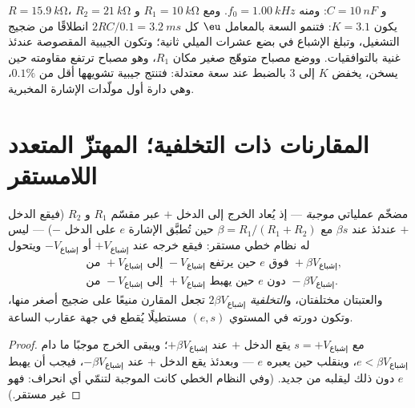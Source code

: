 \begin{example}\label{ex:b2:feedback-oscillators:wiennumbers}
$R = \qty{15.9}{k\ohm}$، و $C = \qty{10}{nF}$: ومنه $f_0 = \qty{1.00}{kHz}$. ومع $R_1 =
\qty{10}{k\ohm}$ و $R_2 = \qty{21}{k\ohm}$ يكون $K = 3.1$: فتنمو السعة بالمعامل
$\eu$ كل $2RC/0.1 = \qty{3.2}{ms}$ انطلاقًا من ضجيج التشغيل، وتبلغ
الإشباع في بضع عشرات الميلي ثانية؛ وتكون الجيبية المقصوصة عندئذ
غنية بالتوافقيات. ووضع مصباح متوهّج صغير مكان $R_1$، وهو مصباح ترتفع
مقاومته حين يسخن، يخفض $K$ إلى $3$ بالضبط عند سعة
معتدلة: فتنتج جيبية تشويهها أقل من $0.1\%$،
وهي دارة أول مولّدات الإشارة المخبرية.
\end{example}

\section{المقارنات ذات التخلفية؛ المهتزّ المتعدد اللامستقر}

\begin{proposition}\label{prop:b2:feedback-oscillators:schmitt}
مضخّم عملياتي  \emph{موجبة} --- إذ يُعاد الخرج إلى الدخل $+$
عبر مقسّم $R_1$ و $R_2$ (فيقع الدخل $+$ عندئذ عند $\beta s$ مع
$\beta = R_1/(R_1 + R_2)$ حين تُطبَّق الإشارة $e$ على الدخل $-$)
--- ليس له نظام خطي مستقر: فيقع خرجه عند $+V_{\text{إشباع}}$ أو
$-V_{\text{إشباع}}$ ويتحول
\begin{align*}
&\text{من } +V_{\text{إشباع}} \text{ إلى } -V_{\text{إشباع}} \text{ حين يرتفع } e \text{ فوق } +\beta V_{\text{إشباع}} ,\\
&\text{من } -V_{\text{إشباع}} \text{ إلى } +V_{\text{إشباع}} \text{ حين يهبط } e \text{ دون } -\beta V_{\text{إشباع}} .
\end{align*}
والعتبتان مختلفتان، و\emph{التخلفية} $2\beta V_{\text{إشباع}}$ تجعل
المقارن منيعًا على ضجيج أصغر منها، وتكون دورته في
المستوي $(e, s)$ مستطيلًا يُقطع في جهة عقارب الساعة.
\end{proposition}

\begin{proof}
مع $s = +V_{\text{إشباع}}$ يقع الدخل $+$ عند $+\beta V_{\text{إشباع}}$؛ ويبقى الخرج
موجبًا ما دام $e < \beta V_{\text{إشباع}}$، وينقلب حين يعبره $e$
--- وبعدئذ يقع الدخل $+$ عند $-\beta V_{\text{إشباع}}$، فيجب أن يهبط $e$
دون ذلك ليقلبه من جديد. (وفي النظام الخطي كانت 
الموجبة لتنمّي أي انحراف: فهو غير مستقر.)
\end{proof}

